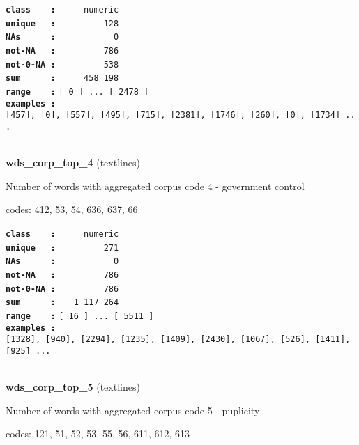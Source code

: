 \documentclass[]{article}
\begin{document}
\textbf{\texttt{class\ \ \ \ :}} \texttt{~~~~~numeric}\\
\textbf{\texttt{unique\ \ \ :}} \texttt{~~~~~~~~~128}\\
\textbf{\texttt{NAs\ \ \ \ \ \ :}} \texttt{~~~~~~~~~~~0}\\
\textbf{\texttt{not-NA\ \ \ :}} \texttt{~~~~~~~~~786}\\
\textbf{\texttt{not-0-NA\ :}} \texttt{~~~~~~~~~538}\\
\textbf{\texttt{sum\ \ \ \ \ \ :}} \texttt{~~~~~458~198}\\
\textbf{\texttt{range\ \ \ \ :}}
\texttt{{[}\ 0\ {]}\ ...\ {[}\ 2478\ {]}}\\
\textbf{\texttt{examples\ :}}
\texttt{{[}457{]},\ {[}0{]},\ {[}557{]},\ {[}495{]},\ {[}715{]},\ {[}2381{]},\ {[}1746{]},\ {[}260{]},\ {[}0{]},\ {[}1734{]}\ ...}\\

~

\textbf{wds\_corp\_top\_4} (textlines)

Number of words with aggregated corpus code 4 - government control

codes: 412, 53, 54, 636, 637, 66

\textbf{\texttt{class\ \ \ \ :}} \texttt{~~~~~numeric}\\
\textbf{\texttt{unique\ \ \ :}} \texttt{~~~~~~~~~271}\\
\textbf{\texttt{NAs\ \ \ \ \ \ :}} \texttt{~~~~~~~~~~~0}\\
\textbf{\texttt{not-NA\ \ \ :}} \texttt{~~~~~~~~~786}\\
\textbf{\texttt{not-0-NA\ :}} \texttt{~~~~~~~~~786}\\
\textbf{\texttt{sum\ \ \ \ \ \ :}} \texttt{~~~1~117~264}\\
\textbf{\texttt{range\ \ \ \ :}}
\texttt{{[}\ 16\ {]}\ ...\ {[}\ 5511\ {]}}\\
\textbf{\texttt{examples\ :}}
\texttt{{[}1328{]},\ {[}940{]},\ {[}2294{]},\ {[}1235{]},\ {[}1409{]},\ {[}2430{]},\ {[}1067{]},\ {[}526{]},\ {[}1411{]},\ {[}925{]}\ ...}\\

~

\textbf{wds\_corp\_top\_5} (textlines)

Number of words with aggregated corpus code 5 - puplicity

codes: 121, 51, 52, 53, 55, 56, 611, 612, 613
\end{document}
